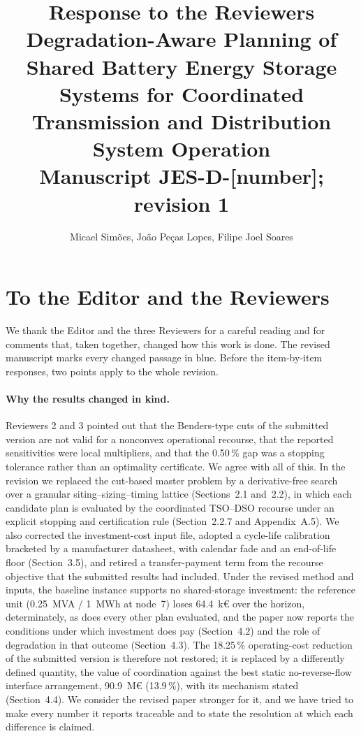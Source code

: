 \documentclass[11pt]{article}
\title{Response to the Reviewers\\
\large Degradation-Aware Planning of Shared Battery Energy Storage Systems for Coordinated Transmission and Distribution System Operation\\
\normalsize Manuscript JES-D-[number]; revision 1}
\author{Micael Sim\~oes, Jo\~ao Pe\c{c}as Lopes, Filipe Joel Soares}
\date{}
\begin{document}
\maketitle

\section*{To the Editor and the Reviewers}

We thank the Editor and the three Reviewers for a careful reading and for comments that, taken
together, changed how this work is done. The revised manuscript marks every changed passage in blue.
Before the item-by-item responses, two points apply to the whole revision.

\paragraph{Why the results changed in kind.}
Reviewers 2 and 3 pointed out that the Benders-type cuts of the submitted version are not valid for a
nonconvex operational recourse, that the reported sensitivities were local multipliers, and that the
0.50\,\% gap was a stopping tolerance rather than an optimality certificate. We agree with all of this. In
the revision we replaced the cut-based master problem by a derivative-free search over a granular
siting--sizing--timing lattice (Sections~2.1 and~2.2), in which each candidate plan is evaluated by the
coordinated TSO--DSO recourse under an explicit stopping and certification rule (Section~2.2.7 and
Appendix~A.5). We also corrected the investment-cost input file, adopted a
cycle-life calibration bracketed by a manufacturer datasheet, with calendar fade and an end-of-life floor (Section~3.5), and
retired a transfer-payment term from the recourse objective that the submitted results had included. Under
the revised method and inputs, the baseline instance supports no shared-storage investment: the reference
unit (0.25~MVA / 1~MWh at node~7) loses 64.4~k\euro{} over the horizon, determinately, as does every other plan
evaluated, and the paper now reports the
conditions under which investment does pay (Section~4.2) and the role of degradation in that outcome
(Section~4.3). The 18.25\,\% operating-cost reduction of the submitted version is therefore not restored;
it is replaced by a differently defined quantity, the value of coordination against the best static
no-reverse-flow interface arrangement, 90.9~M\euro{} (13.9\,\%), with its mechanism stated
(Section~4.4). We consider the revised paper stronger for it, and we have tried to make every number it
reports traceable and to state the resolution at which each difference is claimed.
\end{document}
